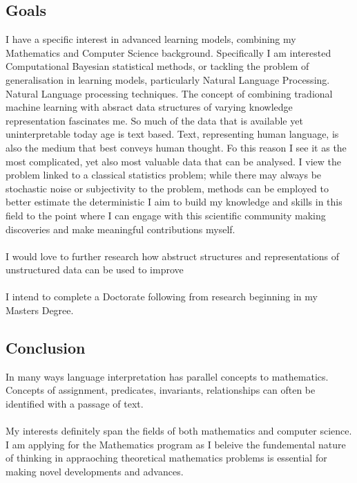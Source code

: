 \subsection*{Goals}
I have a specific interest in advanced learning models, combining my Mathematics and Computer Science background. Specifically I am interested Computational Bayesian statistical methods, or tackling the problem of generalisation in learning models, particularly Natural Language Processing.
\\
Natural Language processing techniques. The concept of combining tradional machine learning with absract data structures of varying knowledge representation fascinates me. So much of the data that is available yet uninterpretable today age is text based. Text, representing human language, is also the medium that best conveys human thought. Fo this reason I see it as the most complicated, yet also most valuable data that can be analysed. I view the problem linked to a classical statistics problem; while there may always be stochastic noise or subjectivity to the problem, methods can be employed to better estimate the deterministic  I aim to build my knowledge and skills in this field to the point where I can engage with this scientific community making discoveries and make meaningful contributions myself.\\
\\
I would love to further research how abstruct structures and representations of unstructured data can be used to improve \\
\\
I intend to complete a Doctorate following from research beginning in my Masters Degree.\\
\subsection*{Conclusion}

In many ways language interpretation has parallel concepts to mathematics. Concepts of assignment, predicates, invariants, relationships can often be identified with a passage of text.\\
\\
My interests definitely span the fields of both mathematics and computer science. I am applying for the Mathematics program as I beleive the fundemental nature of thinking in appraoching theoretical mathematics problems is essential for making novel developments and advances.\\